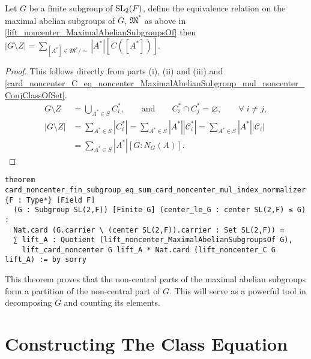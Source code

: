 \begin{theorem}
  \label{card_noncenter_fin_subgroup_eq_sum_card_noncenter_mul_index_normalizer}

Let $G$ be a finite subgroup of $\operatorname{SL}_2(F)$, define the equivalence relation on the maximal abelian subgroups of $G$, $\mathfrak{M}^*$ as above in \ref{lift_noncenter_MaximalAbelianSubgroupsOf}
then 
$|G \! \setminus  \! Z| = \sum_{[A^*] \in \mathfrak{M}^* / \sim} |A^*| [\tilde{C}([A^*])].$

\end{theorem}
\begin{proof}
This follows directly from parts (i), (ii) and (iii) and \eqref{card_noncenter_C_eq_noncenter_MaximalAbelianSubgroup_mul_noncenter_ConjClassOfSet}.
\begin{align*} G \! \setminus \! Z &= \bigcup\limits_{A^* \in S} C_i^*,  \qquad \text{and}  \qquad C_i^* \cap C_j^* = \varnothing, \qquad \forall \;  i \neq j, \\
 |G \! \setminus \! Z| &=  \sum_{A^* \in S} |C_i^*| = \sum_{A^* \in S} |A^*||\mathcal{C}_i^*| = \sum_{A^* \in S} |A^*||\mathcal{C}_i|
\\ &= \sum_{A^* \in S} |A^*| [G:N_G(A)].
\end{align*}
\end{proof}
\begin{footnotesize}
\begin{verbatim}
theorem card_noncenter_fin_subgroup_eq_sum_card_noncenter_mul_index_normalizer {F : Type*} [Field F]
  (G : Subgroup SL(2,F)) [Finite G] (center_le_G : center SL(2,F) ≤ G) :
  Nat.card (G.carrier \ (center SL(2,F)).carrier : Set SL(2,F)) =
  ∑ lift_A : Quotient (lift_noncenter_MaximalAbelianSubgroupsOf G),
    lift_card_noncenter G lift_A * Nat.card (lift_noncenter_C G lift_A) := by sorry
\end{verbatim}
\end{footnotesize}

This theorem proves that the non-central parts of the maximal abelian subgroups form a partition of the non-central part of $G$. This will serve as a powerful tool in decomposing $G$ and counting its elements.

\section{Constructing The Class Equation}

